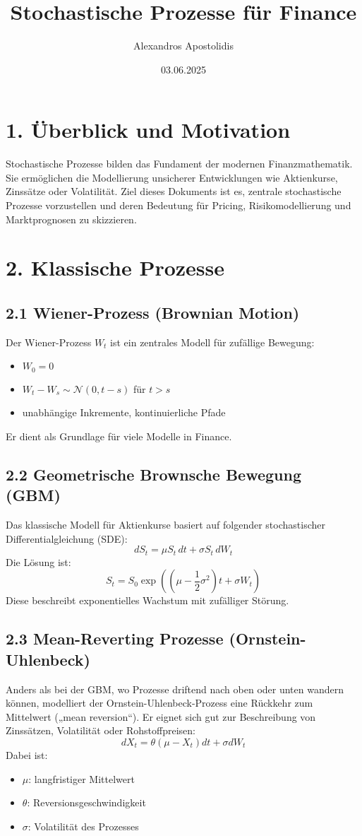 \documentclass[a4paper,12pt]{article}
\title{Stochastische Prozesse für Finance}
\author{Alexandros Apostolidis}
\date{03.06.2025}
\begin{document}
\maketitle

\section*{1. Überblick und Motivation}
Stochastische Prozesse bilden das Fundament der modernen Finanzmathematik. Sie ermöglichen die Modellierung unsicherer Entwicklungen wie Aktienkurse, Zinssätze oder Volatilität. Ziel dieses Dokuments ist es, zentrale stochastische Prozesse vorzustellen und deren Bedeutung für Pricing, Risikomodellierung und Marktprognosen zu skizzieren.

\section*{2. Klassische Prozesse}

\subsection*{2.1 Wiener-Prozess (Brownian Motion)}
Der Wiener-Prozess \( W_t \) ist ein zentrales Modell für zufällige Bewegung:
\begin{itemize}
  \item \( W_0 = 0 \)
  \item \( W_t - W_s \sim \mathcal{N}(0, t-s) \) für \( t > s \)
  \item unabhängige Inkremente, kontinuierliche Pfade
\end{itemize}
Er dient als Grundlage für viele Modelle in Finance.

\subsection*{2.2 Geometrische Brownsche Bewegung (GBM)}
Das klassische Modell für Aktienkurse basiert auf folgender stochastischer Differentialgleichung (SDE):
\[
dS_t = \mu S_t\,dt + \sigma S_t\,dW_t
\]
Die Lösung ist:
\[
S_t = S_0 \exp\left( \left( \mu - \frac{1}{2}\sigma^2 \right)t + \sigma W_t \right)
\]
Diese beschreibt exponentielles Wachstum mit zufälliger Störung.

\clearpage
\subsection*{2.3 Mean-Reverting Prozesse (Ornstein-Uhlenbeck)}
Anders als bei der GBM, wo Prozesse driftend nach oben oder unten wandern können, modelliert der Ornstein-Uhlenbeck-Prozess eine Rückkehr zum Mittelwert („mean reversion“). Er eignet sich gut zur Beschreibung von Zinssätzen, Volatilität oder Rohstoffpreisen:
\[
dX_t = \theta(\mu - X_t)dt + \sigma dW_t
\]
Dabei ist:
\begin{itemize}
  \item \( \mu \): langfristiger Mittelwert
  \item \( \theta \): Reversionsgeschwindigkeit
  \item \( \sigma \): Volatilität des Prozesses
\end{itemize}
\end{document}
